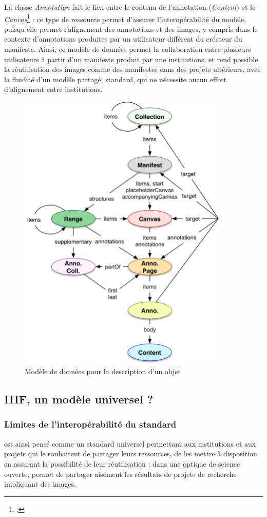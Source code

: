 	La classe \textit{Annotation} fait le lien entre le contenu de l'annotation (\textit{Content}) et le \textit{Canvas}\footcite{PresentationAPI} : ce type de ressource permet d'assurer l'interopérabilité du modèle, puisqu'elle permet l'alignement des annotations et des images, y compris dans le contexte d'annotations produites par un utilisateur différent du créateur du manifeste. Ainsi, ce modèle de données permet la collaboration entre plusieurs utilisateurs à partir d'un manifeste produit par une institutions, et rend possible la réutilisation des images comme des manifestes dans des projets ultérieurs, avec la fluidité d'un modèle partagé, standard, qui ne nécessite aucun effort d'alignement entre institutions.
	
	\begin{figure}[h]
		\centering
		\includegraphics[width=10cm]{images/modele_donnees_iiif.png}
		\caption{Modèle de données \iiif pour la description d'un objet}
		\label{fig:iiif_data_model}
	\end{figure}
    
\subsection{IIIF, un modèle universel ?}
    \subsubsection{Limites de l'interopérabilité du standard}
	\iiif est ainsi pensé comme un standard universel permettant aux institutions et aux projets qui le souhaitent de partager leurs ressources, de les mettre à disposition en assurant la possibilité de leur réutilisation : dans une optique de science ouverte, \iiif permet de partager aisément les résultats de projets de recherche impliquant des images.
	
